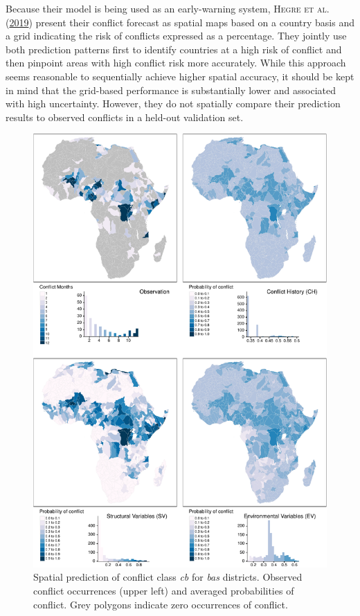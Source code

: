 \documentclass[a4paper,11pt]{article}
\begin{document}
Because their model is being used as an early-warning system, \textsc{\textnormal{Hegre} \textnormal{et al.}} \textsc{(\textnormal{\protect\hyperlink{ref-hegre2019}{2019}})} present
their conflict forecast as spatial maps based on a country basis and a
grid indicating the risk of conflicts expressed as a percentage. They jointly use
both prediction patterns first to identify countries at a high risk of conflict
and then pinpoint areas with high conflict risk more accurately. While this approach
seems reasonable to sequentially achieve higher spatial accuracy, it should be kept in mind
that the grid-based performance is substantially lower and associated with high
uncertainty. However, they do not spatially compare their prediction results
to observed conflicts in a held-out validation set.
\begin{figure}[H]

{\centering \includegraphics{thesis_files/figure-latex/04-results-spatial-bas-1} 

}

\caption[Spatial prediction of conflict class \textit{cb} for \textit{adm} districts.]{Spatial prediction of conflict class \textit{cb} for \textit{bas} districts. Observed conflict occurrences (upper left) and averaged probabilities of conflict. Grey polygons indicate zero occurrences of conflict.}\label{fig:04-results-spatial-bas}
\end{figure}
\end{document}
